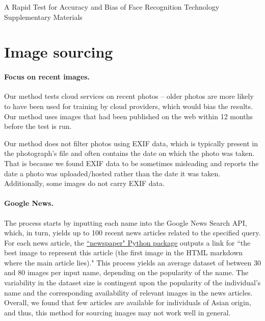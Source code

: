 \documentclass[10pt,twocolumn,letterpaper]{article}
\newif\ifarxiv
\begin{document}
\clearpage
\begin{appendices}
\onecolumn
\setcounter{figure}{0}    
\setcounter{table}{0} 
\setcounter{section}{0}
\renewcommand{\thesection}{\Alph{section}}%
\renewcommand\thefigure{S.\arabic{figure}} 
\renewcommand\thetable{S.\arabic{table}}
\begin{center}
    \begin{minipage}{\textwidth}
        \centering
        \fontsize{16}{20}\selectfont\bf
        \ifarxiv
        \else
        A Rapid Test for Accuracy and Bias of Face Recognition Technology\\
        \fi
        Supplementary Materials
        \vspace{12pt}
    \end{minipage}
\end{center}


\section{Image sourcing}
\label{appendix:image-sourcing}

\paragraph{Focus on recent images.} Our method tests cloud services on recent photos -- older photos are more likely to have been used for training by cloud providers, which would bias the results. Our method uses images that had been published on the web within 12 months before the test is run. 

Our method does not filter photos using EXIF data, which is typically present in the photograph's file and often contains the date on which the photo was taken. That is because we found EXIF data to be sometimes misleading and reports the date a photo was uploaded/hosted rather than the date it was taken. Additionally, some images do not carry EXIF data. 

\paragraph{Google News.} The process starts by inputting each name into the Google News Search API, which, in turn, yields up to 100 recent news articles related to the specified query. For each news article, the \href{https://github.com/codelucas/newspaper}{``newspaper" Python package} outputs a link for ``the best image to represent this article (the first image in the HTML markdown where the main article lies)." This process yields an average dataset of between 30 and 80 images per input name, depending on the popularity of the name. The variability in the dataset size is contingent upon the popularity of the individual's name and the corresponding availability of relevant images in the news articles. Overall, we found that few articles are available for individuals of Asian origin, and thus, this method for sourcing images may not work well in general.


\end{appendices}
\end{document}
